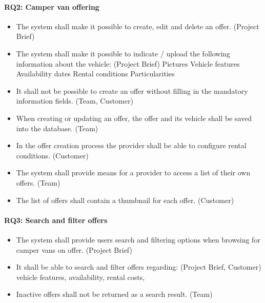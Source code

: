 \paragraph{RQ2: Camper van offering}
\begin{itemize}
    \item The system shall make it possible to create, edit and delete an offer. (Project Brief)
    \item The system shall make it possible to indicate / upload the following information about the vehicle: (Project Brief)
        \subitem Pictures
        \subitem Vehicle features
        \subitem Availability dates
        \subitem Rental conditions
        \subitem Particularities
    \item It shall not be possible to create an offer without filling in the mandatory information fields. (Team, Customer)
    \item When creating or updating an offer, the offer and its vehicle shall be saved into the database. (Team)
    \item In the offer creation process the provider shall be able to configure rental conditions. (Customer)
    \item The system shall provide means for a provider to access a list of their own offers. (Team)
    \item The list of offers shall contain a thumbnail for each offer. (Customer)
\end{itemize}

\paragraph{RQ3: Search and filter offers}
\begin{itemize}
    \item The system shall provide users search and filtering options when browsing for camper vans on offer. (Project Brief)
    \item It shall be able to search and filter offers regarding: (Project Brief, Customer)
        \subitem vehicle features,
        \subitem availability,
        \subitem rental costs,
    \item Inactive offers shall not be returned as a search result. (Team)
\end{itemize}


